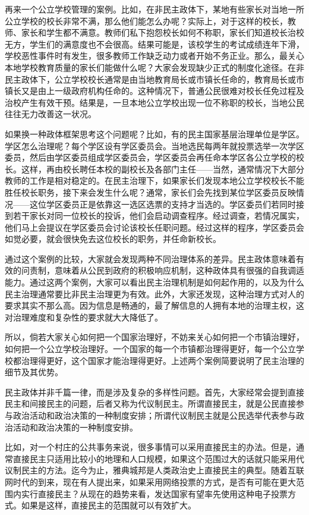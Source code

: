 再来一个公立学校管理的案例。比如，在非民主政体下，某地有些家长对当地一所公立学校的校长非常不满，那么他们能怎么办呢？实际上，对于这样的校长，教师、家长和学生都不满意。教师们私下抱怨校长如何不称职，家长们知道校长治校无方，学生们的满意度也不会很高。结果可能是，该校学生的考试成绩连年下滑，学校恶性事件时有发生，很多教师工作缺乏动力或者开始不务正业。那么，最关心本地学校教育质量的家长们能做什么呢？大家会发现缺少正式的制度化途径。在非民主政体下，公立学校校长通常是由当地教育局长或市镇长任命的，教育局长或市镇长又是由上一级政府机构任命的。这种情况下，普通公民很难对校长任免过程及治校产生有效干预。结果是，一旦本地公立学校出现一位不称职的校长，当地公民往往无力改善这一状况。

如果换一种政体框架思考这个问题呢？比如，有的民主国家基层治理单位是学区。学区怎么治理呢？每个学区设有学区委员会。当地选民每两年就投票选举一次学区委员，然后由学区委员组成学区委员会，学区委员会再任命本学区各公立学校的校长。这样，再由校长聘任本校的副校长及各部门主任——当然，通常情况下大部分教师的工作是相对稳定的。在民主治理下，如果家长们发现本地公立学校校长不能胜任校长职务，接下来会发生什么呢？通常，家长们会先找到某位学区委员反映情况——这位学区委员正是依靠这一选区选票的支持才当选的。学区委员们若同时接到若干家长对同一位校长的投诉，他们会启动调查程序。经过调查，若情况属实，他们马上会提议在学区委员会讨论该校长任职问题。经过这样的程序，学区委员会如觉必要，就会很快免去这位校长的职务，并任命新校长。

通过这个案例的比较，大家就会发现两种不同治理体系的差异。民主政体意味着有效的问责制，意味着从公民到政府的积极响应机制，这种政体具有很强的自我调适能力。通过这两个案例，大家可以看出民主治理机制是如何起作用的，以及为什么民主治理通常要比非民主治理更为有效。此外，大家还发现，这种治理方式对人的要求其实不那么高。因为信息是畅通的，最了解信息的人拥有本地的治理主权，这对治理难度和复杂性的要求就大大降低了。

所以，倘若大家关心如何把一个国家治理好，不妨来关心如何把一个市镇治理好，如何把一个公立学校治理好。一个国家的每一个市镇都治理得更好，每一个公立学校都治理得更好，这个国家才能治理得更好。上述两个案例简要说明了民主治理的细节及其优势。


民主政体并非千篇一律，而是涉及复杂的多样性问题。首先，大家经常会提到直接民主和间接民主的问题，后者又称为代议制民主。所谓直接民主，就是公民直接参与政治活动和政治决策的一种制度安排；所谓代议制民主就是公民选举代表参与政治活动和政治决策的一种制度安排。

比如，对一个村庄的公共事务来说，很多事情可以采用直接民主的办法。但是，通常直接民主只适用比较小的地理和人口规模，如果这个范围过大的话就只能采用代议制民主的方法。迄今为止，雅典城邦是人类政治史上直接民主的典型。随着互联网时代的到来，现在有人提出来，如果采用网络投票的方式，是否有可能在更大范围内实行直接民主？从现在的趋势来看，发达国家有望率先使用这种电子投票方式。如果是这样，直接民主的范围就可以有效扩大。

